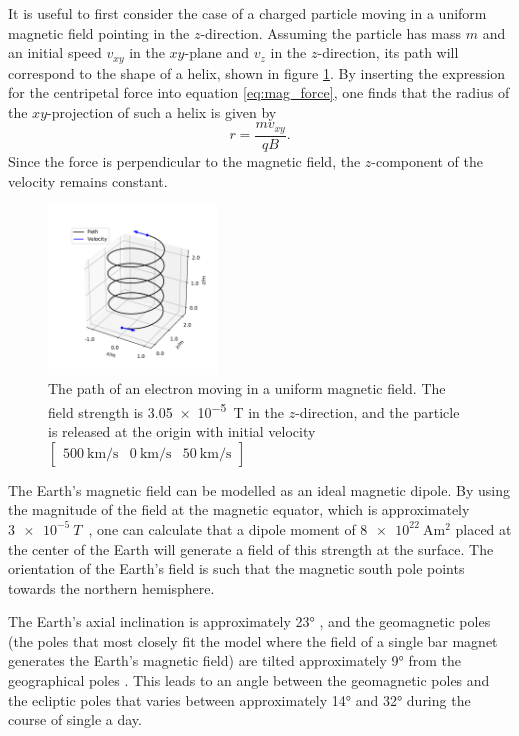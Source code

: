 \documentclass[5p,sort&compress]{elsarticle}
\begin{document}
It is useful to first consider the case of a charged particle moving in a uniform magnetic field pointing in the $z$-direction. Assuming the particle has mass $m$ and an initial speed $v_{xy}$ in the $xy$-plane and $v_z$ in the $z$-direction, its path will correspond to the shape of a helix, shown in figure \ref{fig:uniform}. By inserting the expression for the centripetal force into equation \ref{eq:mag_force}, one finds that the radius of the $xy$-projection of such a helix is given by
\begin{equation}
    r = \frac{m v_{xy}}{q B}.
    \label{eq:helix_radius}
\end{equation}
Since the force is perpendicular to the magnetic field, the $z$-component of the velocity remains constant.

\begin{figure}[h]
    \centering
    \includegraphics[width=0.4\textwidth]{uniform.pdf}
    \caption{The path of an electron moving in a uniform magnetic field. The field strength is \SI{3.05e-5}{\tesla} in the $z$-direction, and the particle is released at the origin with initial velocity $\begin{bmatrix}\SI{500}{\kilo \meter /\second} & \SI{0}{\kilo \meter /\second} & \SI{50}{\kilo \meter /\second}\end{bmatrix}$}
    \label{fig:uniform}
\end{figure}

The Earth's magnetic field can be modelled as an ideal magnetic dipole. By using the magnitude of the field at the magnetic equator, which is approximately $\SI{3e-5}{T}$~\cite{Lang2010}, one can calculate that a dipole moment of $\SI{8e22}{\ampere \meter^2}$ placed at the center of the Earth will generate a field of this strength at the surface. The orientation of the Earth's field is such that the magnetic south pole points towards the northern hemisphere.

The Earth's axial inclination is approximately \ang{23} \cite{nasa2014}, and the geomagnetic poles (the poles that most closely fit the model where the field of a single bar magnet generates the Earth's magnetic field) are tilted approximately \ang{9} from the geographical poles \cite{kyoto2020}. This leads to an angle between the geomagnetic poles and the ecliptic poles that varies between approximately \ang{14} and \ang{32} during the course of single a day.
\end{document}
